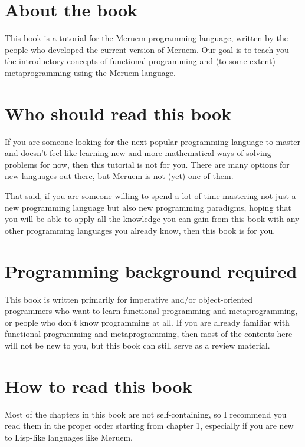 \section{About the book}
This book is a tutorial for the Meruem programming language, written by the people who developed the current version of Meruem. Our goal is to teach you the introductory concepts of functional programming and (to some extent) metaprogramming using the Meruem language. 

\section{Who should read this book}
If you are someone looking for the next popular programming language to master and doesn't feel like learning new and more mathematical ways of solving problems for now, then this tutorial is not for you. There are many options for new languages out there, but Meruem is not (yet) one of them.

That said, if you are someone willing to spend a lot of time mastering not just a new programming language but also new programming paradigms, hoping that you will be able to apply all the knowledge you can gain from this book with any other programming languages you already know, then this book is for you.

\section{Programming background required}
This book is written primarily for imperative and/or object-oriented programmers who want to learn functional programming and metaprogramming, or people who don't know programming at all. If you are already familiar with functional programming and metaprogramming, then most of the contents here will not be new to you, but this book can still serve as a review material.

\section{How to read this book}
Most of the chapters in this book are not self-containing, so I recommend you read them in the proper order starting from chapter 1, especially if you are new to Lisp-like languages like Meruem. 
